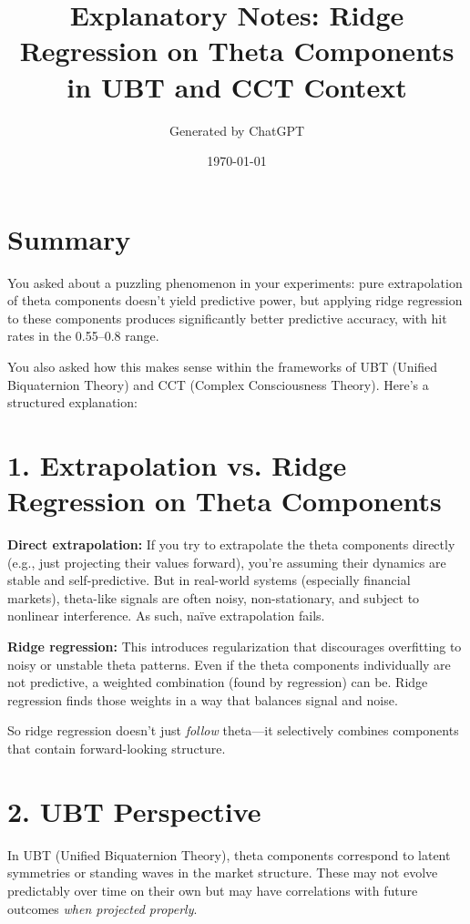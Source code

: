 \documentclass[11pt]{article}
\title{Explanatory Notes: Ridge Regression on Theta Components in UBT and CCT Context}
\author{Generated by ChatGPT}
\date{\today}
\begin{document}
\maketitle

\section*{Summary}

You asked about a puzzling phenomenon in your experiments: pure extrapolation of theta components doesn't yield predictive power, but applying ridge regression to these components produces significantly better predictive accuracy, with hit rates in the 0.55–0.8 range.

You also asked how this makes sense within the frameworks of UBT (Unified Biquaternion Theory) and CCT (Complex Consciousness Theory). Here's a structured explanation:

\section*{1. Extrapolation vs. Ridge Regression on Theta Components}

\textbf{Direct extrapolation:} If you try to extrapolate the theta components directly (e.g., just projecting their values forward), you're assuming their dynamics are stable and self-predictive. But in real-world systems (especially financial markets), theta-like signals are often noisy, non-stationary, and subject to nonlinear interference. As such, naïve extrapolation fails.

\textbf{Ridge regression:} This introduces regularization that discourages overfitting to noisy or unstable theta patterns. Even if the theta components individually are not predictive, a weighted combination (found by regression) can be. Ridge regression finds those weights in a way that balances signal and noise.

So ridge regression doesn't just \emph{follow} theta—it selectively combines components that contain forward-looking structure.

\section*{2. UBT Perspective}

In UBT (Unified Biquaternion Theory), theta components correspond to latent symmetries or standing waves in the market structure. These may not evolve predictably over time on their own but may have correlations with future outcomes \emph{when projected properly}.
\end{document}
